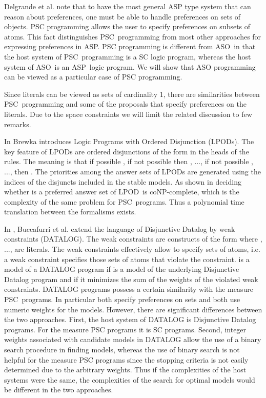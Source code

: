 \documentclass[letterpaper]{article}\usepackage{aaai}
\begin{document}
Delgrande et al. note that to have the most general ASP type system that can
reason about preferences, one must be able to handle preferences on sets of
objects. PSC programming allows the user to specify preferences on subsets of
atoms. This fact distinguishes PSC\ programming from most other approaches for
expressing preferences in ASP. PSC programming is different from ASO\ in that
the host system of PSC\ programming is a SC logic program, whereas the host
system of ASO\ is an ASP\ logic program. We will show that ASO programming can
be viewed as a particular case of PSC programming.

Since literals can be viewed as sets of cardinality 1, there are similarities
between PSC\ programming and some of the proposals that specify preferences on
the literals. Due to the space constraints we will limit the related
discussion to few remarks.

In \cite{Brewka02} Brewka introduces Logic Programs with Ordered Disjunction
(LPODs). The key feature of LPODs are ordered disjunctions of the form
 in the heads of the rules. The meaning is that if
possible , if not possible  then , ..., if not possible
, ..., then . The priorities among the answer sets of
LPODs are generated using the indices of the disjuncts included in the stable
models. As shown in \cite{BrewkaNS04} deciding whether  is a preferred
answer set of LPOD\  is coNP-complete, which is the complexity of the same
problem for PSC\ programs. Thus a polynomial time translation between the
formalisms exists.

In \cite{BuccafurriLR00}, Buccafurri et al. extend the language of Disjunctive
Datalog by weak constraints (DATALOG). The weak constraints
are constructs of the form  where , ...,
 are literals. The weak constraints effectively allow to specify sets
of atoms, i.e. a weak constraint specifies those sets of atoms that violate
the constraint.  is a model of a DATALOG program if
 is a model of the underlying Disjunctive Datalog program and if it
minimizes the sum of the weights of the violated weak constraints.
DATALOG programs possess a certain similarity with the
measure PSC\ programs. In particular both specify preferences on sets and both
use numeric weights for the models. However, there are significant differences
between the two approaches. First, the host system of DATALOG
is Disjunctive Datalog programs. For the measure PSC programs it is SC
programs. Second, integer weights associated with candidate models in
DATALOG allow the use of a binary search procedure in finding
models, whereas the use of binary search is not helpful for the measure PSC
programs since the stopping criteria is not easily determined due to the
arbitrary weights. Thus if the complexities of the host systems were the same,
the complexities of the search for optimal models would be different in the
two approaches.
\end{document}
